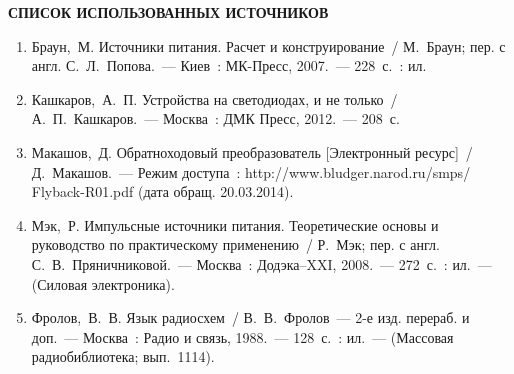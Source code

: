 \documentclass[notitlepage,pscyr]{hedwork}
\begin{document}
  \onehalfspacing
  
  \begin{center}
    \bf
    СПИСОК ИСПОЛЬЗОВАННЫХ ИСТОЧНИКОВ
  \end{center}
  
  \begin{enumerate}
    \item Браун,~М. Источники питания. Расчет и конструирование~/
      М.~Браун; пер. с англ. С.~Л.~Попова.~--- Киев~: МК-Пресс, 2007.~---
      228~с.~: ил.
    \item Кашкаров,~А.~П. Устройства на светодиодах, и не только~/
      А.~П.~Кашкаров.~--- Москва~: ДМК Пресс, 2012.~--- 208~с.
    \item Макашов,~Д. Обратноходовый преобразователь [Электронный ресурс]~/
      Д.~Макашов.~--- Режим доступа~:
      http://www.bludger.narod.ru/smps/\\Flyback-R01.pdf
      (дата обращ. 20.03.2014).
    \item Мэк,~Р. Импульсные источники питания. Теоретические основы и
      руководство по практическому применению~/ Р.~Мэк; пер. с англ.
      С.~В.~Пряничниковой.~--- Москва~: Додэка--XXI, 2008.~--- 272~с.~: ил.~---
      (Силовая электроника).
    \item Фролов,~В.~В. Язык радиосхем~/ В.~В.~Фролов~--- 2-е изд.
      перераб. и доп.~--- Москва~: Радио и связь, 1988.~--- 128~с.~: ил.~---
      (Массовая радиобиблиотека; вып.~1114).
  \end{enumerate}
\end{document}
